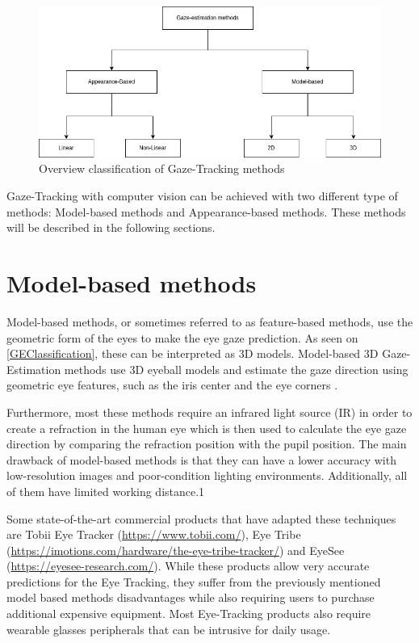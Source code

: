 \begin{figure}
    \centering
    \includegraphics[scale=0.6]{img/figures/methods_classification.png}
    \caption{Overview classification of Gaze-Tracking methods }
    \label{GEClassification}
 \end{figure}


Gaze-Tracking with computer vision can be achieved with two different type of methods: Model-based methods and Appearance-based methods. These methods will be described in the following sections.

\section{Model-based methods}
Model-based methods, or sometimes referred to as feature-based methods, use the geometric form of the eyes to make the eye gaze prediction.
As seen on \autoref{GEClassification}, these can be interpreted as 3D models. Model-based 3D Gaze-Estimation
methods use 3D eyeball models and estimate the gaze direction using geometric eye features, such as the iris center and the eye corners \cite{general_theory_remote_gaze_3d_model}.

Furthermore, most these methods require an infrared light source (IR) in order to create a refraction in the human eye which is then used to calculate the eye gaze direction by comparing the refraction position with the pupil position. The main drawback of model-based methods is that they can have a lower accuracy with low-resolution images and poor-condition lighting environments. Additionally, all of them have limited working distance.1

Some state-of-the-art commercial products that have adapted these techniques are Tobii Eye Tracker (\url{https://www.tobii.com/}), Eye Tribe (\url{https://imotions.com/hardware/the-eye-tribe-tracker/}) and EyeSee (\url{https://eyesee-research.com/}). 
While these products allow very accurate predictions for the Eye Tracking, they suffer from the previously mentioned model based methods disadvantages while also requiring users to purchase additional expensive equipment. Most Eye-Tracking products also require wearable glasses peripherals that can be intrusive for daily usage. 

